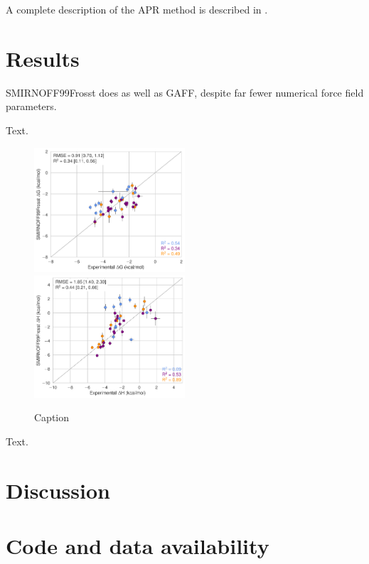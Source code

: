 \documentclass[9pt,lineno]{elife}
\begin{document}
A complete description of the APR method is described in \cite{henriksen_computational_2015}.

\section{Results}
SMIRNOFF99Frosst does as well as GAFF, despite far fewer numerical force field parameters.

Text.
\begin{figure}[tb]
\centering
\includegraphics[width=0.5\textwidth]{images/SMIRNOFF99Frosst-vs-Experiment-dG.pdf}
\includegraphics[width=0.5\textwidth]{images/SMIRNOFF99Frosst-vs-Experiment-dH.pdf}
\vspace{0.1cm}
\caption{Caption}
\label{fig:S99-vs-experiment}
\vspace{-0.6cm}
\end{figure}
Text.

\section{Discussion}


\section{Code and data availability}
\end{document}
